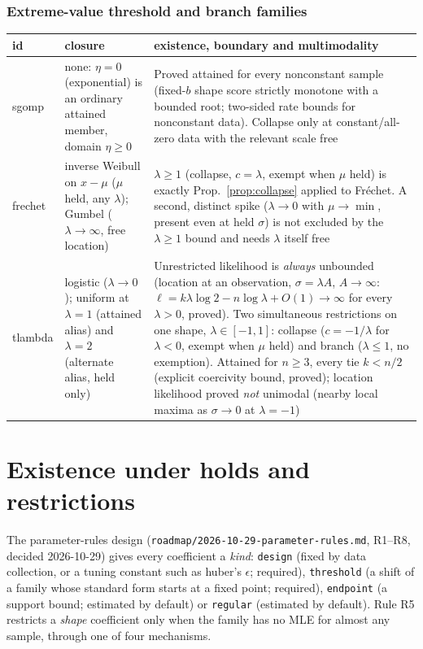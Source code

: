 \documentclass[11pt]{article}
\newcommand{\code}[1]{\texttt{#1}}
\theoremstyle{plain}
\theoremstyle{definition}
\theoremstyle{remark}
\begin{document}
\subsubsection*{Extreme-value threshold and branch families}

\begin{center}
\small
\begin{tabular}{@{}l p{4.2cm} p{8.2cm}@{}}
\toprule
id & closure & existence, boundary and multimodality \\
\midrule
sgomp & none: $\eta=0$ (exponential) is an ordinary attained member,
  domain $\eta\ge0$ &
  Proved attained for every nonconstant sample (fixed-$b$ shape score
  strictly monotone with a bounded root; two-sided rate bounds for
  nonconstant data). Collapse only at constant/all-zero data with the
  relevant scale free \\
frechet & inverse Weibull on $x-\mu$ ($\mu$ held, any $\lambda$); Gumbel
  ($\lambda\to\infty$, free location) &
  $\lambda\ge1$ (collapse, $c=\lambda$, exempt when $\mu$ held) is exactly
  Prop.~\ref{prop:collapse} applied to Fr\'echet. A second, distinct spike
  ($\lambda\to0$ with $\mu\to\min$, present even at held $\sigma$) is not
  excluded by the $\lambda\ge1$ bound and needs $\lambda$ itself free \\
tlambda & logistic ($\lambda\to0$); uniform at $\lambda=1$ (attained
  alias) and $\lambda=2$ (alternate alias, held only) &
  Unrestricted likelihood is \emph{always} unbounded (location at an
  observation, $\sigma=\lambda A$, $A\to\infty$: $\ell=k\lambda\log2-n\log
  \lambda+O(1)\to\infty$ for every $\lambda>0$, proved). Two simultaneous
  restrictions on one shape, $\lambda\in[-1,1]$: collapse ($c=-1/\lambda$
  for $\lambda<0$, exempt when $\mu$ held) and branch ($\lambda\le1$, no
  exemption). Attained for $n\ge3$, every tie $k<n/2$ (explicit coercivity
  bound, proved); location likelihood proved \emph{not} unimodal (nearby
  local maxima as $\sigma\to0$ at $\lambda=-1$) \\
\bottomrule
\end{tabular}
\end{center}

\section{Existence under holds and restrictions}\label{sec:holds-restrictions}

The parameter-rules design (\code{roadmap/2026-10-29-parameter-rules.md},
R1--R8, decided 2026-10-29) gives every coefficient a \emph{kind}:
\code{design} (fixed by data collection, or a tuning constant such as
huber's $\epsilon$; required), \code{threshold} (a shift of a family whose
standard form starts at a fixed point; required), \code{endpoint} (a support
bound; estimated by default) or \code{regular} (estimated by default). Rule
R5 restricts a \emph{shape} coefficient only when the family has no MLE for
almost any sample, through one of four mechanisms.
\end{document}
